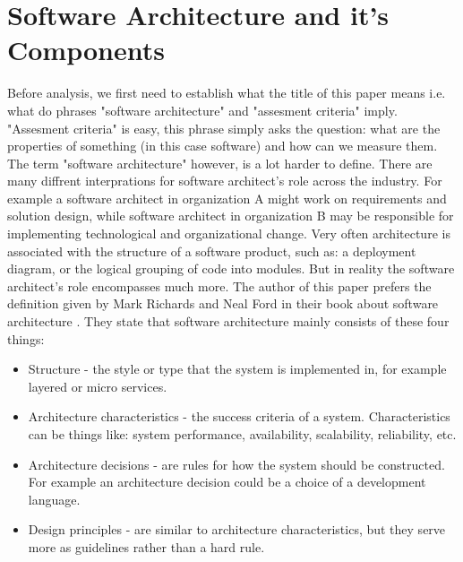 \documentclass[12pt]{article}
\begin{document}
\section{Software Architecture and it's Components}
Before analysis, we first need to establish what the title of this paper means i.e. what do phrases "software architecture" and "assesment criteria" imply. "Assesment criteria" is easy, this phrase simply asks the question: what are the properties of something (in this case software) and how can we measure them. The term "software architecture" however, is a lot harder to define. There are many diffrent interprations for software architect's role across the industry. For example a software architect in organization A might work on requirements and solution design, while software architect in organization B may be responsible for implementing technological and organizational change. Very often architecture is associated with the structure of a software product, such as: a deployment diagram, or the logical grouping of code into modules. But in reality the software architect's role encompasses much more. The author of this paper prefers the definition given by Mark Richards and Neal Ford in their book about software architecture \cite{RF20}. They state that software architecture mainly consists of these four things:
\begin{itemize}
    \item Structure - the style or type that the system is implemented in, for example layered or micro services.
    \item Architecture characteristics - the success criteria of a system. Characteristics can be things like: system performance, availability, scalability, reliability, etc.
    \item Architecture decisions - are rules for how the system should be constructed. For example an architecture decision could be a choice of a development language.
    \item Design principles - are similar to architecture characteristics, but they serve more as guidelines rather than a hard rule.
\end{itemize}
\end{document}
